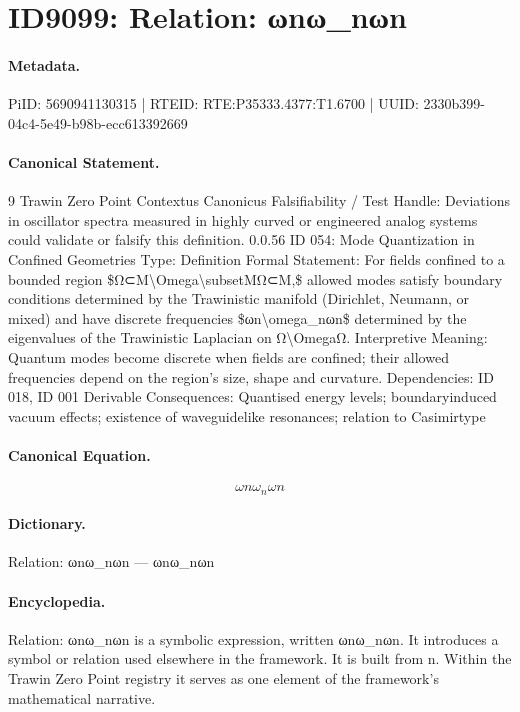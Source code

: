 \section*{ID9099: Relation: ωnω\_nωn}
\paragraph{Metadata.}
PiID: 5690941130315 | RTEID: RTE:P35333.4377:T1.6700 | UUID: 2330b399-04c4-5e49-b98b-ecc613392669

\paragraph{Canonical Statement.}
9 Trawin Zero Point Contextus Canonicus Falsifiability / Test Handle: Deviations in oscillator spectra measured in highly curved or engineered analog systems could validate or falsify this definition. 0.0.56 ID 054: Mode Quantization in Confined Geometries Type: Definition Formal Statement: For fields confined to a bounded region \$Ω⊂M\textbackslash{}Omega\textbackslash{}subsetMΩ⊂M,\$ allowed modes satisfy boundary conditions determined by the Trawinistic manifold (Dirichlet, Neumann, or mixed) and have discrete frequencies \$ωn\textbackslash{}omega\_nωn\$ determined by the eigenvalues of the Trawinistic Laplacian on Ω\textbackslash{}OmegaΩ. Interpretive Meaning: Quantum modes become discrete when fields are confined; their allowed frequencies depend on the region’s size, shape and curvature. Dependencies: ID 018, ID 001 Derivable Consequences: Quantised energy levels; boundaryinduced vacuum effects; existence of waveguidelike resonances; relation to Casimirtype

\paragraph{Canonical Equation.}
\[
ωn\omega_nωn
\]

\paragraph{Dictionary.}
Relation: ωnω\_nωn — ωnω\_nωn

\paragraph{Encyclopedia.}
Relation: ωnω\_nωn is a symbolic expression, written ωnω\_nωn. It introduces a symbol or relation used elsewhere in the framework. It is built from n. Within the Trawin Zero Point registry it serves as one element of the framework's mathematical narrative.
